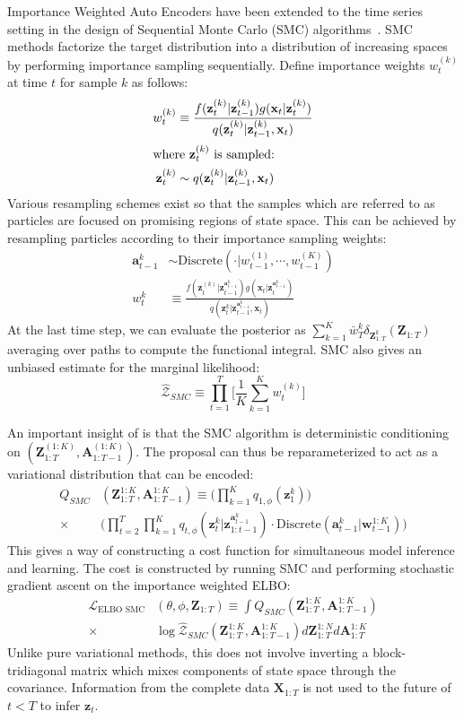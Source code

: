 \documentclass{article}
\newcommand{\be}{\begin{equation}}
\newcommand{\ee}{\end{equation}}
\newcommand{\trm}[1]{\textrm{#1}}
\newcommand{\mbf}[1]{\mathbf{#1}}
\newcommand{\msc}[1]{\mathscr{#1}}
\newcommand{\bx}{\mbf{x}}
\newcommand{\bX}{\mbf{X}}
\newcommand{\bZ}{\mbf{Z}}
\newcommand{\bz}{\mbf{z}}
\newcommand{\baa}{\mbf{a}}
\begin{document}
Importance Weighted Auto Encoders have been extended to the time series setting in the design of Sequential Monte Carlo (SMC) algorithms~\cite{DBLP:conf/aistats/NaessethLRB18, NIPS2017_7235, anh2018autoencoding}. SMC methods factorize the target distribution into a distribution of increasing spaces by performing importance sampling sequentially. Define importance weights $w_t^{(k)}$ at time $t$ for sample $k$ as follows:
\begin{align}
w_t^{(k)} &\equiv \frac{f(\bz_t^{(k)}|\bz_{t-1}^{(k)})g(\bx_t|\bz_t^{(k)})}{q(\bz_t^{(k)}|\bz_{t-1}^{(k)},\bx_t)} \\
\intertext{where $\bz_t^{(k)}$ is sampled:} 
\bz_t^{(k)} &\sim q(\bz_t^{(k)}|\bz_{t-1}^{(k)},\bx_t)
\end{align}
Various resampling schemes exist so that the samples which are referred to as particles are focused on promising regions of state space. This can be achieved by resampling particles according to their importance sampling weights:
\begin{align}
\baa_{t-1}^{k} &\sim \text{Discrete}(\cdot|w_{t-1}^{(1)}, \cdots, w_{t-1}^{(K)})  \\
w_t^k &\equiv \frac{f(\bz_t^{(k)}|\bz_{t-1}^{\baa_{t-1}^k})g(\bx_t|\bz_t^{\baa_{t-1}^k})}{q(\bz_t^{k}|\bz_{t-1}^{\baa_{t-1}^k},\bx_t)} 
\end{align}
At the last time step, we can evaluate the posterior as $\sum\limits_{k=1}^{K}\bar w_T^k\delta_{\bZ_{1:T}^k}(\bZ_{1:T})$ averaging over paths to compute the functional integral. SMC also gives an unbiased estimate for the marginal likelihood:
\be
\hat{\mathcal{Z}}_{SMC} \equiv \prod\limits_{t=1}^{T}\Big[\frac{1}{K}\sum\limits_{k=1}^{K}w_t^{(k)} \Big] 
\ee

An important insight of \cite{NIPS2017_7235, anh2018autoencoding} is that the SMC algorithm is deterministic conditioning on $(\bZ_{1:T}^{(1:K)}, \mbf{A}_{1:T-1}^{(1:K)})$. The proposal can thus be reparameterized to act as a variational distribution that can be encoded:
\begin{align}
Q_{SMC}&(\bZ_{1:T}^{1:K}, \mbf{A}_{1:T-1}^{1:K}) \equiv \Bigg(\prod\limits_{k=1}^{K}q_{1,\phi}(\bz_1^k) \Bigg) \\
\times &\Bigg(\prod\limits_{t=2}^{T}\prod\limits_{k=1}^{K}q_{t,\phi}(\bz_t^k|\bz_{1:t-1}^{\baa_{t-1}^k})\cdot\text{Discrete}(\baa_{t-1}^k |\mbf{w}_{t-1}^{1:K}) \Bigg) \nonumber
\end{align}
This gives a way of constructing a cost function for simultaneous model inference and learning. The cost is constructed by running SMC and performing stochastic gradient ascent on the importance weighted ELBO:
\begin{align}
 \msc{L}_{\trm{ELBO SMC}}&(\theta, \phi, \bZ_{1:T}) \equiv \int Q_{SMC}(\bZ_{1:T}^{1:K}, \mbf{A}_{1:T-1}^{1:K})\\
 \times &\log \hat{\mathcal{Z}}_{SMC}(\bZ_{1:T}^{1:K}, \mbf{A}_{1:T-1}^{1:K})d\bZ_{1:T}^{1:N}d\mbf{A}_{1:T}^{1:K} \nonumber
\end{align}
Unlike pure variational methods, this does not involve inverting a block-tridiagonal matrix which mixes components of state space through the covariance. Information from the complete data $\bX_{1:T}$ is not used to the future of $t<T$ to infer $\bz_t$.
\end{document}
